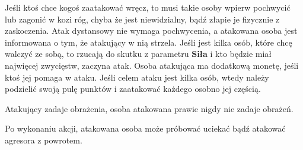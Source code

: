 	Jeśli ktoś chce kogoś zaatakować wręcz, to musi takie osoby wpierw pochwycić lub zagonić w kozi róg, chyba że jest niewidzialny, bądź złapie je fizycznie z zaskoczenia.
	Atak dystansowy nie wymaga pochwycenia, a atakowana osoba jest informowana o tym, że atakujący w nią strzela.
	Jeśli jest kilka osób, które chcę walczyć ze sobą, to rzucają do skutku z parametru \textbf{Siła} i kto będzie miał najwięcej zwycięstw, zaczyna atak.
	Osoba atakująca ma dodatkową monetę, jeśli ktoś jej pomaga w ataku.
	Jeśli celem ataku jest kilka osób, wtedy należy podzielić swoją pulę punktów i zaatakować każdego osobno jej częścią.
	
	Atakujący zadaje obrażenia, osoba atakowana prawie nigdy nie zadaje obrażeń.
	
	Po wykonaniu akcji, atakowana osoba może próbować uciekać bądź atakować agresora z powrotem.

